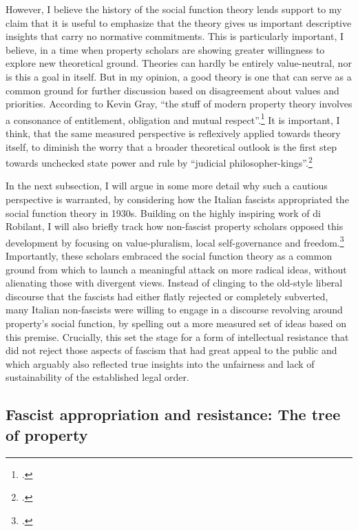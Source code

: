 However, I believe the history of the social function theory lends support to my claim that it is useful to emphasize that the theory gives us important descriptive insights that carry no normative commitments. This is particularly important, I believe, in a time when property scholars are showing greater willingness to explore new theoretical ground. Theories can hardly be entirely value-neutral, nor is this a goal in itself. But in my opinion, a good theory is one that can serve as a common ground for further discussion based on disagreement about values and priorities. According to Kevin Gray, ``the stuff of modern property theory involves a consonance of entitlement, obligation and mutual respect''.\footcite[37]{gray11} It is important, I think, that the same measured perspective is reflexively applied towards theory itself, to diminish the worry that a broader theoretical outlook is the first step towards unchecked state power and rule by ``judicial philosopher-kings''.\footcite[944]{claeys09}

In the next subsection, I will argue in some more detail why such a cautious perspective is warranted, by considering how the Italian fascists appropriated the social function theory in 1930s. Building on the highly inspiring work of di Robilant, I will also briefly track how non-fascist property scholars opposed this development by focusing on value-pluralism, local self-governance and freedom.\footcite{robilant13} Importantly, these scholars embraced the social function theory as a common ground from which to launch a meaningful attack on more radical ideas, without alienating those with divergent views. Instead of clinging to the old-style liberal discourse that the fascists had either flatly rejected or completely subverted, many Italian non-fascists were willing to engage in a discourse revolving around property's social function, by spelling out a more measured set of ideas based on this premise. Crucially, this set the stage for a form of intellectual resistance that did not reject those aspects of fascism that had great appeal to the public and which arguably also reflected true insights into the unfairness and lack of sustainability of the established legal order.

\subsection{Fascist appropriation and resistance: {T}he tree of property}

